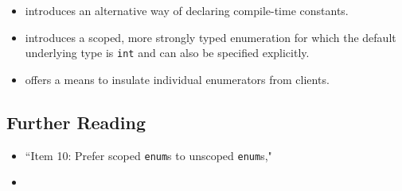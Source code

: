 \begin{itemize}
\item{introduces an alternative way of declaring compile-time constants.}
\item{introduces a scoped, more strongly typed enumeration for which the default underlying type is \lstinline!int! and can also be specified explicitly.}
\item{offers a means to insulate individual enumerators from clients.}
\end{itemize}

\subsection[Further Reading]{Further Reading}\label{further-reading}

\begin{itemize}
\item{``Item 10: Prefer scoped \texttt{enum}s to unscoped \texttt{enum}s," \cite{meyers15}}
\item{\cite{grimm17}}
\end{itemize}

